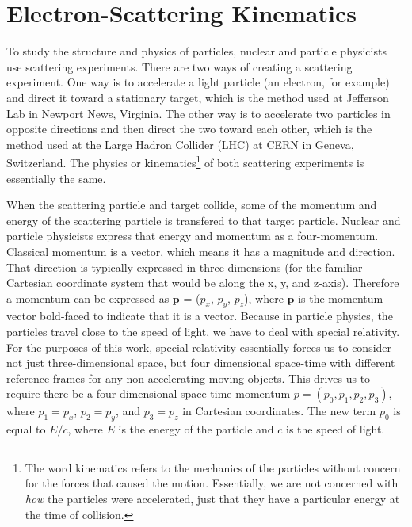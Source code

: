 \section{Electron-Scattering Kinematics}
To study the structure and physics of particles, nuclear and particle physicists use scattering experiments. There are two ways of creating a scattering experiment. One way is to accelerate a light particle (an electron, for example) and direct it toward a stationary target, which is the method used at Jefferson Lab in Newport News, Virginia. The other way is to accelerate two particles in opposite directions and then direct the two toward each other, which is the method used at the Large Hadron Collider (LHC) at CERN in Geneva, Switzerland. The physics or kinematics\footnote{The word kinematics refers to the mechanics of the particles without concern for the forces that caused the motion. Essentially, we are not concerned with \textit{how} the particles were accelerated, just that they have a particular energy at the time of collision.} of both scattering experiments is essentially the same. 

When the scattering particle and target collide, some of the momentum and energy of the scattering particle is transfered to that target particle. Nuclear and particle physicists express that energy and momentum as a four-momentum. Classical momentum is a vector, which means it has a magnitude and direction. That direction is typically expressed in three dimensions (for the familiar Cartesian coordinate system that would be along the x, y, and z-axis). Therefore a momentum can be expressed as $\mathbf{p}$ = ($p_x$, $p_y$, $p_z$), where $\mathbf{p}$ is the momentum vector bold-faced to indicate that it is a vector. Because in particle physics, the particles travel close to the speed of light, we have to deal with special relativity. For the purposes of this work, special relativity essentially forces us to consider not just three-dimensional space, but four dimensional space-time with different reference frames for any non-accelerating moving objects. This drives us to require there be a four-dimensional space-time momentum $p=(p_0,p_1,p_2,p_3)$, where $p_1=p_x$, $p_2=p_y$, and $p_3=p_z$ in Cartesian coordinates. The new term $p_0$ is equal to $E/c$, where $E$ is the energy of the particle and $c$ is the speed of light.

